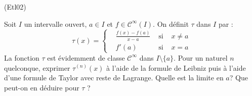 \begin{tiny}(Etl02)\end{tiny}
Soit $I$ un intervalle ouvert, $a\in I$ et $f\in \mathcal C^\infty(I)$. On définit $\tau$ dans $I$ par :
\begin{displaymath}
 \tau(x)=
\left\lbrace 
\begin{aligned}
 &\frac{f(x)-f(a)}{x-a} &\text{ si }& x\neq a \\
 &f'(a)  &\text{ si }& x= a 
\end{aligned}
\right. 
\end{displaymath}
La fonction $\tau$ est évidemment de classe $\mathcal C^\infty$ dans $I\setminus\{a\}$. Pour un naturel $n$ quelconque, exprimer $\tau^{(n)}(x)$ à l'aide de la formule de Leibniz puis à l'aide d'une formule de Taylor avec reste de Lagrange. Quelle est la limite en $a$? Que peut-on en déduire pour $\tau$ ?